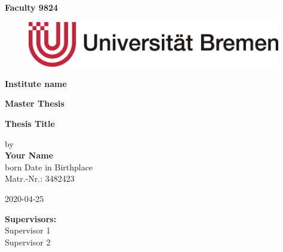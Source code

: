 \documentclass[oneside,12pt,a4paper,bibliography=totoc,numbers=noenddot,table]{scrreprt} %
\begin{document}

\begin{titlepage}
\thispagestyle{empty}
\begin{center}

\textsf{\textbf{Faculty 9824}}\\

\begin{figure}[h!]
    \centering
    \includegraphics[height=2cm]{includes/UniBremen.pdf}
\end{figure}

\textsf{\textbf{Institute name}}\\[1,0cm]

\begin{Large}
    \textsf{\textbf{Master Thesis}}\\[0,75cm]
\end{Large}

\begin{LARGE}
    \textsf{\textbf{Thesis Title}}\\[1,5cm]
\end{LARGE}


\vfill

\begin{large}
    \textsf{by}\\[0,1cm]
    \textsf{\textbf{Your Name}}\\[0,1cm]
    \textsf{born Date in Birthplace}\\[0,1cm]
    \textsf{Matr.-Nr.: 3482423}\\

    \vspace{0.5em}

    \textsf{2020-04-25}
\end{large}

\vfill

\begin{large}
    \textsf{\textbf{Supervisors:}}\\[0,3cm]
        \textsf{Supervisor 1}\\[0.5em]
        \textsf{Supervisor 2}\\[0.5em]
    \end{large}

\end{center}

\end{titlepage}
\thispagestyle{empty}
\cleardoublepage
\end{document}
